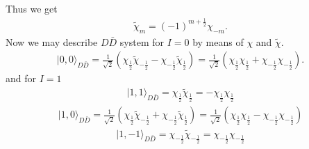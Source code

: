 \documentclass[aps,prd,preprintnumbers,showpacs,showkeys,nofootinbib,
superscriptaddress,fleqn,floatfix,tightenlines, 10pt]{revtex4-1}
\begin{document}
Thus we get
\begin{align}
	\tilde{\chi}_m = (-1)^{m+\frac{1}{2}} \chi_{-m}.
\end{align}
Now we may describe $D\bar{D}$ system for $I=0$ by means of $\chi$ and $\tilde{\chi}$.
\begin{align}
	|0,0\rangle_{D\bar{D}} = \frac{1}{\sqrt{2}} \left(\chi_{\frac{1}{2}} \tilde{\chi}_{-\frac{1}{2}} -
	\chi_{-\frac{1}{2}} \tilde{\chi}_{\frac{1}{2}} \right)
	= \frac{1}{\sqrt{2}} \left(\chi_{\frac{1}{2}}\chi_{\frac{1}{2}} + \chi_{-\frac{1}{2}}\chi_{-\frac{1}{2}} \right).
\end{align}
and for $I=1$
\begin{align}
	|1,1\rangle_{D\bar{D}} = \chi_{\frac{1}{2}} \tilde{\chi}_{\frac{1}{2}} = -\chi_{\frac{1}{2}}\chi_{\frac{1}{2}}
\end{align}
\begin{align}
	|1,0\rangle_{D\bar{D}} = \frac{1}{\sqrt{2}} \left(\chi_{\frac{1}{2}} \tilde{\chi}_{-\frac{1}{2}} +
	\chi_{-\frac{1}{2}} \tilde{\chi}_{\frac{1}{2}} \right)
	= \frac{1}{\sqrt{2}} \left(\chi_{\frac{1}{2}}\chi_{\frac{1}{2}} - \chi_{-\frac{1}{2}}\chi_{-\frac{1}{2}} \right)
\end{align}
\begin{align}
	|1,-1\rangle_{D\bar{D}} = \chi_{-\frac{1}{2}} \tilde{\chi}_{-\frac{1}{2}} = \chi_{-\frac{1}{2}}\chi_{-\frac{1}{2}}
\end{align}
%
\end{document}
